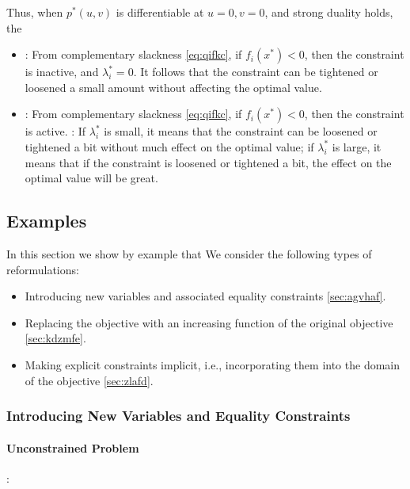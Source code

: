 \documentclass{article}
\begin{document}
Thus, when $p^{* }(u, v)$ is differentiable at $u=0, v=0$, and strong duality holds, the 
\begin{itemize}
    \item {}: From complementary slackness \cref{eq:qifkc}, if $f_{i}\left(x^{* }\right)<0$, then the constraint is inactive, and $\lambda_{i}^* =0$. It follows that the constraint can be tightened or loosened a small amount without affecting the optimal value. 
    \item {}: From complementary slackness \cref{eq:qifkc}, if $f_{i}\left(x^{* }\right)<0$, then the constraint is active. : If $\lambda_{i}^{* }$ is small, it means that the constraint can be loosened or tightened a bit without much effect on the optimal value; if $\lambda_{i}^{* }$ is large, it means that if the constraint is loosened or tightened a bit, the effect on the optimal value will be great.
\end{itemize}

\subsection{Examples}
In this section we show by example that  We consider the following types of reformulations:
\begin{itemize}
    \item Introducing new variables and associated equality constraints \cref{sec:agvhaf}.
    \item Replacing the objective with an increasing function of the original objective \cref{sec:kdzmfe}. 
    \item Making explicit constraints implicit, i.e., incorporating them into the domain of the objective \cref{sec:zlafd}.
\end{itemize}
\subsubsection{Introducing New Variables and Equality Constraints}
\paragraph{Unconstrained Problem}
:
\end{document}
